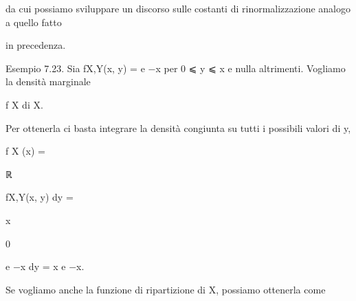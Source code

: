 \documentclass[a4paper,portrait,12pt]{article}
\begin{document}
\begin{flushleft}
da cui possiamo sviluppare un discorso sulle costanti di rinormalizzazione analogo a quello fatto
\end{flushleft}


\begin{flushleft}
in precedenza.
\end{flushleft}


\begin{flushleft}
Esempio 7.23. Sia fX,Y(x, y) = e $-$x per 0 ⩽ y ⩽ x e nulla altrimenti. Vogliamo la densit\`{a} marginale
\end{flushleft}


\begin{flushleft}
f X di X.
\end{flushleft}


\begin{flushleft}
Per ottenerla ci basta integrare la densit\`{a} congiunta su tutti i possibili valori di y,
\end{flushleft}


\begin{flushleft}
f X (x) =
\end{flushleft}





\begin{flushleft}
ℝ
\end{flushleft}





\begin{flushleft}
fX,Y(x, y) dy =
\end{flushleft}





\begin{flushleft}
x
\end{flushleft}


0





\begin{flushleft}
e $-$x dy = x e $-$x.
\end{flushleft}





\begin{flushleft}
Se vogliamo anche la funzione di ripartizione di X, possiamo ottenerla come
\end{flushleft}
\end{document}
